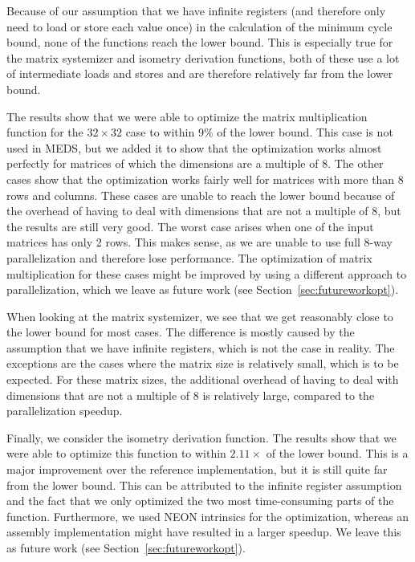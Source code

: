 \documentclass[11pt,a4paper]{report}
\theoremstyle{definition}
\begin{document}
Because of our assumption that we have infinite registers (and therefore only need to load or store each value once) in the calculation of the minimum cycle bound, none of the functions reach the lower bound. This is especially true for the matrix systemizer and isometry derivation functions, both of these use a lot of intermediate loads and stores and are therefore relatively far from the lower bound.

The results show that we were able to optimize the matrix multiplication function for the $32 \times 32$ case to within 9\% of the lower bound. This case is not used in MEDS, but we added it to show that the optimization works almost perfectly for matrices of which the dimensions are a multiple of 8. The other cases show that the optimization works fairly well for matrices with more than 8 rows and columns. These cases are unable to reach the lower bound because of the overhead of having to deal with dimensions that are not a multiple of 8, but the results are still very good. The worst case arises when one of the input matrices has only 2 rows. This makes sense, as we are unable to use full 8-way parallelization and therefore lose performance. The optimization of matrix multiplication for these cases might be improved by using a different approach to parallelization, which we leave as future work (see Section~\ref{sec:futureworkopt}).

When looking at the matrix systemizer, we see that we get reasonably close to the lower bound for most cases. The difference is mostly caused by the assumption that we have infinite registers, which is not the case in reality. The exceptions are the cases where the matrix size is relatively small, which is to be expected. For these matrix sizes, the additional overhead of having to deal with dimensions that are not a multiple of 8 is relatively large, compared to the parallelization speedup.

Finally, we consider the isometry derivation function. The results show that we were able to optimize this function to within $2.11\times$ of the lower bound. This is a major improvement over the reference implementation, but it is still quite far from the lower bound. This can be attributed to the infinite register assumption and the fact that we only optimized the two most time-consuming parts of the function. Furthermore, we used NEON intrinsics for the optimization, whereas an assembly implementation might have resulted in a larger speedup. We leave this as future work (see Section~\ref{sec:futureworkopt}).
\end{document}
